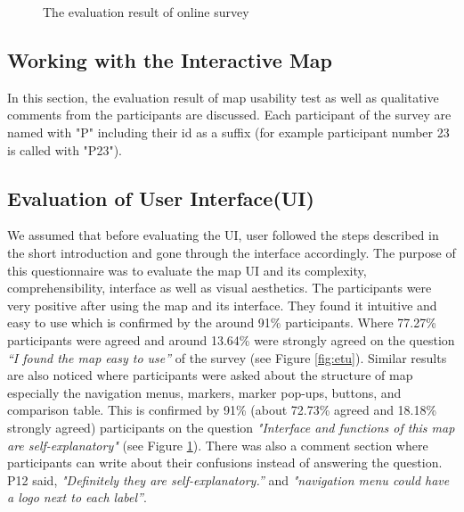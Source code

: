 \begin{figure}
  \begin{center}
\hfill
{}
\hfill
\caption{The evaluation result of online survey}
\label{fig:selfExp}
\end{center}
\end{figure}

\subsection{Working with the Interactive Map}

In this section, the evaluation result of map usability test as well as qualitative comments from the participants are discussed. Each participant of the survey are named with "P" including their id as a suffix (for example participant number 23 is called with "P23"). 

\subsection*{Evaluation of User Interface(UI)}

We assumed that before evaluating the UI, user followed the steps described in the short introduction and gone through the interface accordingly. The purpose of this questionnaire was to evaluate the map UI and its complexity, comprehensibility, interface as well as visual aesthetics. The participants were very positive after using the map and its interface. They found it intuitive and easy to use which is confirmed by the around 91\% participants. Where 77.27\% participants were agreed and around 13.64\% were strongly agreed on the question \textit{“I found the map easy to use”} of the survey (see Figure \ref{fig:etu}). Similar results are also noticed where participants were asked about the structure of map especially the navigation menus, markers, marker pop-ups, buttons, and comparison table. This is confirmed by 91\% (about 72.73\% agreed and 18.18\% strongly agreed) participants on the question \textit{"Interface and functions of this map are self-explanatory"} (see Figure \ref{fig:selfExp}). There was also a comment section where participants can write about their confusions instead of answering the question. P12 said, \textit{"Definitely they are self-explanatory.”} and \textit{"navigation menu could have a logo next to each label”}. 


